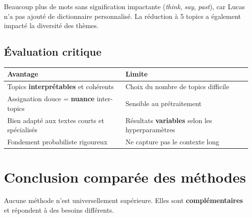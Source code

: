 \documentclass[12pt,a4paper]{article}
\begin{document}
\begin{avertissement}
Beaucoup plus de mots sans signification impactante (\textit{think}, \textit{say}, \textit{past}), car Lucas n'a pas ajouté de dictionnaire personnalisé. La réduction à 5 topics a également impacté la diversité des thèmes.
\end{avertissement}

\subsection{Évaluation critique}

\begin{center}
\begin{tabular}{ll}
\toprule
\textbf{Avantage} & \textbf{Limite} \\
\midrule
Topics \textbf{interprétables} et cohérents       & Choix du nombre de topics difficile \\
Assignation douce = \textbf{nuance} inter-topics  & Sensible au prétraitement \\
Bien adapté aux textes courts et spécialisés      & Résultats \textbf{variables} selon les hyperparamètres \\
Fondement probabiliste rigoureux                  & Ne capture pas le contexte long \\
\bottomrule
\end{tabular}
\end{center}


\pagebreak
\section{Conclusion comparée des méthodes}

Aucune méthode n'est universellement supérieure. Elles sont \textbf{complémentaires} et répondent à des besoins différents.
\end{document}

